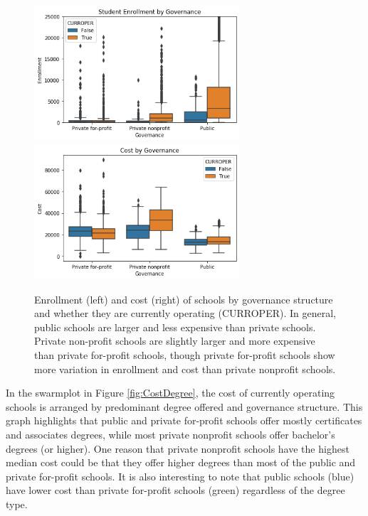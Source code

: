 \documentclass[11pt, letterpaper]{article}
\begin{document}
\begin{figure}[h]
\begin{center}
\includegraphics[width=3in]{currentUGDSControlBox.png}
\includegraphics[width=3in]{currentPriceControlBox.png}
\caption{Enrollment (left) and cost (right) of schools by governance structure and whether they are currently operating (CURROPER).  In general, public schools are larger and less expensive than private schools. Private non-profit schools are slightly larger and more expensive than private for-profit schools, though private for-profit schools show more variation in enrollment and cost than private nonprofit schools.}
\label{fig:Control}
\end{center}
\end{figure}

In the swarmplot in Figure \ref{fig:CostDegree}, the cost of currently operating schools is arranged by predominant degree offered and governance structure. This graph highlights that public and private for-profit schools offer mostly certificates and associates degrees, while most private nonprofit schools offer bachelor's degrees (or higher). One reason that private nonprofit schools have the highest median cost could be that they offer higher degrees than most of the public and private for-profit schools. It is also interesting to note that public schools (blue) have lower cost than private for-profit schools (green) regardless of the degree type.
\end{document}
